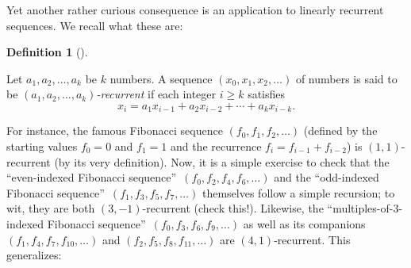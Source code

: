\documentclass[numbers=enddot,12pt,final,onecolumn,notitlepage]{scrartcl}%
\newcounter{exer}
\numberwithin{exer}{subsection}
\theoremstyle{definition}
\newtheorem{defi}[theo]{Definition}
\newenvironment{definition}[1][]
{\begin{defi}[#1]\begin{leftbar}}
{\end{leftbar}\end{defi}}
\begin{document}
Yet another rather curious consequence is an application to linearly recurrent
sequences. We recall what these are:

\begin{definition}
Let $a_{1},a_{2},\ldots,a_{k}$ be $k$ numbers. A sequence $\left(  x_{0}%
,x_{1},x_{2},\ldots\right)  $ of numbers is said to be $\left(  a_{1}%
,a_{2},\ldots,a_{k}\right)  $\emph{-recurrent} if each integer $i\geq k$
satisfies%
\[
x_{i}=a_{1}x_{i-1}+a_{2}x_{i-2}+\cdots+a_{k}x_{i-k}.
\]

\end{definition}

For instance, the famous Fibonacci sequence $\left(  f_{0},f_{1},f_{2}%
,\ldots\right)  $ (defined by the starting values $f_{0}=0$ and $f_{1}=1$ and
the recurrence $f_{i}=f_{i-1}+f_{i-2}$) is $\left(  1,1\right)  $-recurrent
(by its very definition). Now, it is a simple exercise to check that the
\textquotedblleft even-indexed Fibonacci sequence\textquotedblright\ $\left(
f_{0},f_{2},f_{4},f_{6},\ldots\right)  $ and the \textquotedblleft odd-indexed
Fibonacci sequence\textquotedblright\ $\left(  f_{1},f_{3},f_{5},f_{7}%
,\ldots\right)  $ themselves follow a simple recursion; to wit, they are both
$\left(  3,-1\right)  $-recurrent (check this!). Likewise, the
\textquotedblleft multiples-of-$3$-indexed Fibonacci
sequence\textquotedblright\ $\left(  f_{0},f_{3},f_{6},f_{9},\ldots\right)  $
as well as its companions $\left(  f_{1},f_{4},f_{7},f_{10},\ldots\right)  $
and $\left(  f_{2},f_{5},f_{8},f_{11},\ldots\right)  $ are $\left(
4,1\right)  $-recurrent. This generalizes:
\end{document}
